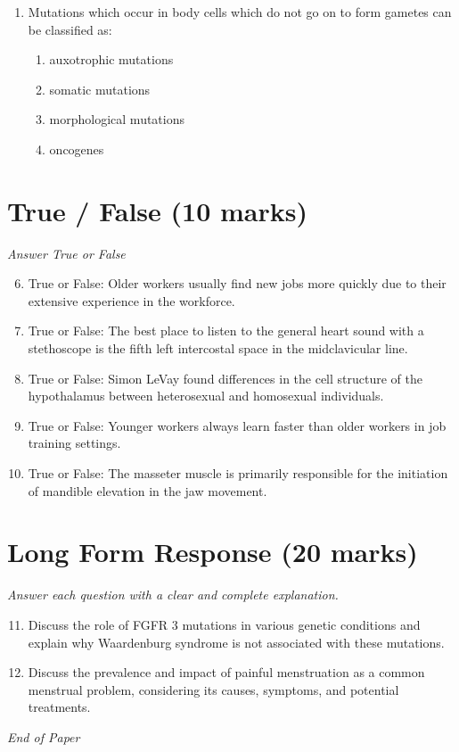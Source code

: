 \documentclass[12pt]{article}
\begin{document}
\begin{enumerate}[label=\arabic*.]
\begin{enumerate}[label=(\alph*)]
    \item all of the above
\end{enumerate}
\item Mutations which occur in body cells which do not go on to form gametes can be classified as:
\begin{enumerate}[label=(\alph*)]
    \item auxotrophic mutations
    \item somatic mutations
    \item morphological mutations
    \item oncogenes
\end{enumerate}
\end{enumerate}

\section*{True / False (10 marks)}
\textit{Answer True or False}
\begin{enumerate}[label=\arabic*.]
\setcounter{enumi}{5}
\item True or False: Older workers usually find new jobs more quickly due to their extensive experience in the workforce.
\item True or False: The best place to listen to the general heart sound with a stethoscope is the fifth left intercostal space in the midclavicular line.
\item True or False: Simon LeVay found differences in the cell structure of the hypothalamus between heterosexual and homosexual individuals.
\item True or False: Younger workers always learn faster than older workers in job training settings.
\item True or False: The masseter muscle is primarily responsible for the initiation of mandible elevation in the jaw movement.
\end{enumerate}

\section*{Long Form Response (20 marks)}
\textit{Answer each question with a clear and complete explanation.}
\begin{enumerate}[label=\arabic*.]
\setcounter{enumi}{10}
\item Discuss the role of FGFR 3 mutations in various genetic conditions and explain why Waardenburg syndrome is not associated with these mutations.
\item Discuss the prevalence and impact of painful menstruation as a common menstrual problem, considering its causes, symptoms, and potential treatments.
\end{enumerate}

\vfill
\noindent\textit{End of Paper}
\end{document}

